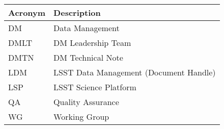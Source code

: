 \addtocounter{table}{-1}
\begin{longtable}{|l|p{}|}\hline
\textbf{Acronym} & \textbf{Description}  \\\hline

DM & Data Management \\\hline
DMLT & DM Leadership Team \\\hline
DMTN & DM Technical Note \\\hline
LDM & LSST Data Management (Document Handle) \\\hline
LSP & LSST Science Platform \\\hline
QA & Quality Assurance \\\hline
WG & Working Group \\\hline
\end{longtable}
